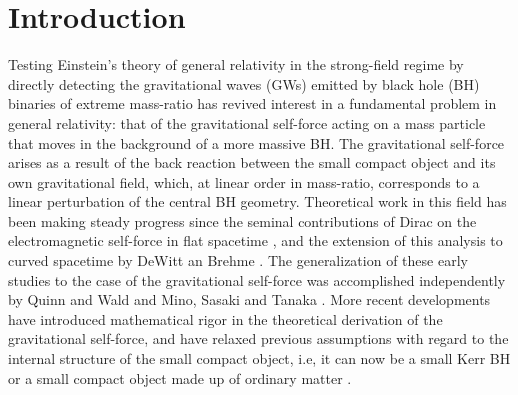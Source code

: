 \newcommand{\Real}{\mbox{Re}}
\newcommand{\Imag}{\mbox{Im}}
\newcommand{\Pade}{Pad\'{e}\xspace}
\newcommand{\pade}{\Pade}



%
\def\ie{{\it i.e.}}  \def\eg{{\it e.g.}}
\def\lap{\hbox{${_{\displaystyle<}\atop^{\displaystyle\sim}}$}}
\def\gap{\hbox{${_{\displaystyle>}\atop^{\displaystyle\sim}}$}}
\def\lesssim{\mathrel{\hbox{\rlap{\hbox{\lower4pt\hbox{$\sim$}}}\hbox{$<$}}}}
\def\gtrsim{\mathrel{\hbox{\rlap{\hbox{\lower4pt\hbox{$\sim$}}}\hbox{$>$}}}}
\def\alt{\mathrel{\hbox{\rlap{\hbox{\lower4pt\hbox{$\sim$}}}\hbox{$<$}}}}
\def\agt{\mathrel{\hbox{\rlap{\hbox{\lower4pt\hbox{$\sim$}}}\hbox{$>$}}}}
\def\PRD{{\it Phys. Rev.} D~}
\def\PRL{{\it Phys.Rev.} Lett~}
\def\apjl{{\it Astrophys. J.} Lett~}
\def\Msun{M_\odot}
\def\PR{{\it Phys. Rev.}}
\def\CQG{{\it Class. Quantum Grav.}}
\def\aaps{{\it A\&AS~ }}
\def\pasj{{\it PASJ }}
\def\mnras{{\it MNRAS}} 
\def\gta{\ifmmode {\mathbin{\lower 3pt\hbox   %
    {$\,\rlap{\raise 5pt\hbox{$\char'076$}}\mathchar"7218\,$}}}
    \else {${\mathbin{\lower 3pt\hbox
    {$\rlap{\raise 5pt\hbox{$\char'076$}}\mathchar"7218\,$}}}
    $}\fi}
\def\lta{\ifmmode {\,\mathbin{\lower 3pt\hbox   %
    {$\,\rlap{\raise 5pt\hbox{$\char'074$}}\mathchar"7218\,$}}}
    \else {${\mathbin{\lower 3pt\hbox
    {$\rlap{\raise 5pt\hbox{$\char'074$}}\mathchar"7218\,$}}}
    $}\fi}

    


\section{Introduction}    

Testing Einstein's theory of general relativity in the strong-field regime by directly detecting the gravitational waves (GWs) emitted by black hole (BH) binaries of extreme mass-ratio has revived interest in a fundamental problem in general relativity: that of the gravitational self-force acting on a mass particle that moves in the background of a more massive BH. The gravitational self-force arises as  a result of the back reaction between the  small compact object and its own gravitational field, which, at linear order in mass-ratio, corresponds to a linear perturbation of the central BH geometry. Theoretical work in this field has been making steady progress since the seminal contributions of Dirac on the electromagnetic self-force in flat spacetime \cite{dirac}, and the extension of this analysis to curved spacetime by DeWitt an Brehme \cite{dewitt}.   The generalization of these early studies to the case of the gravitational self-force was accomplished independently by Quinn and Wald \cite{qwald} and 
Mino, Sasaki and Tanaka \cite{mino}. More recent developments have introduced mathematical rigor in the theoretical derivation of the gravitational self-force, and have relaxed previous assumptions with regard to the internal structure of the small compact object, i.e, it can now be a small Kerr BH or a small compact object made up of ordinary matter \cite{grallaI,grallaII}. 


